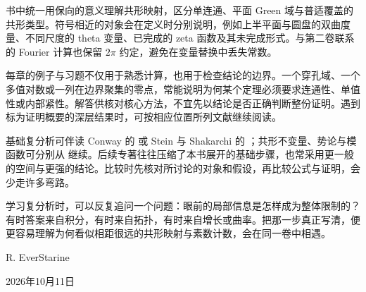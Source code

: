 \ProseParagraphBreak

书中统一用保向的意义理解共形映射，区分单连通、平面 Green 域与普适覆盖的共形类型。符号相近的对象会在定义时分别说明，例如上半平面与圆盘的双曲度量、不同尺度的 theta 变量、已完成的 zeta 函数及其未完成形式。与第二卷联系的 Fourier 计算也保留 \(2\pi\) 约定，避免在变量替换中丢失常数。

\ProseParagraphBreak

每章的例子与习题不仅用于熟悉计算，也用于检查结论的边界。一个穿孔域、一个多值对数或一列在边界聚集的零点，常能说明为何某个定理必须要求连通性、单值性或内部紧性。解答供核对核心方法，不宜先以结论是否正确判断整份证明。遇到标为证明概要的深层结果时，可按相应位置所列文献继续阅读。

\ProseParagraphBreak

基础复分析可伴读 Conway 的 \cite{Conway1978Functions} 或 Stein 与 Shakarchi 的 \cite{Stein2003Complex}；共形不变量、势论与模函数可分别从 \cite{Ahlfors2010Conformal,Ransford1995Potential,Apostol1990Modular} 继续。后续专著往往压缩了本书展开的基础步骤，也常采用更一般的空间与更强的结论。比较时先核对所讨论的对象和假设，再比较公式与证明，会少走许多弯路。

\ProseParagraphBreak

学习复分析时，可以反复追问一个问题：眼前的局部信息是怎样成为整体限制的？有时答案来自积分，有时来自拓扑，有时来自增长或曲率。把那一步真正写清，便更容易理解为何看似相距很远的共形映射与素数计数，会在同一卷中相遇。

\bigskip
\begin{flushright}
R. EverStarine

2026年10月11日
\end{flushright}
